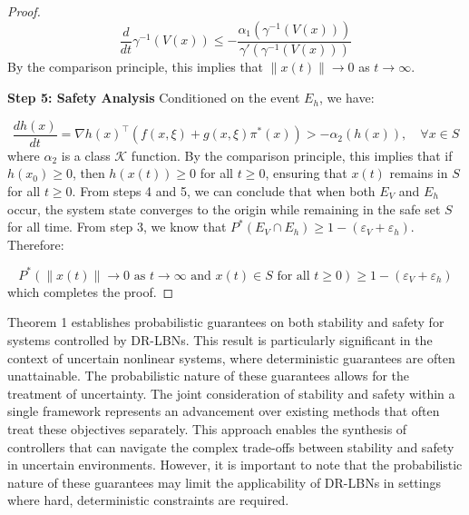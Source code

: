 \documentclass[11pt, oneside]{article}
\begin{document}
\begin{proof}
\begin{equation}
    \frac{d}{dt}\gamma^{-1}(V(x)) \leq -\frac{\alpha_1(\gamma^{-1}(V(x)))}{\gamma'(\gamma^{-1}(V(x)))}
\end{equation}
%
By the comparison principle, this implies that $\|x(t)\| \to 0$ as $t \to \infty$.

\textbf{Step 5: Safety Analysis}
%
Conditioned on the event $E_h$, we have:

\begin{equation}
    \frac{dh(x)}{dt} = \nabla h(x)^\top(f(x,\xi) + g(x,\xi)\pi^*(x)) > -\alpha_2(h(x)), \quad \forall x \in S
    \label{eq:barrier_increase}
\end{equation}
%
where $\alpha_2$ is a class $\mathcal{K}$ function. By the comparison principle, this implies that if $h(x_0) \geq 0$, then $h(x(t)) \geq 0$ for all $t \geq 0$, ensuring that $x(t)$ remains in $S$ for all $t \geq 0$. From steps 4 and 5, we can conclude that when both $E_V$ and $E_h$ occur, the system state converges to the origin while remaining in the safe set $S$ for all time. From step 3, we know that $P^*(E_V \cap E_h) \geq 1 - (\varepsilon_V + \varepsilon_h)$. Therefore:

\begin{equation}
    P^*(\|x(t)\| \to 0 \text{ as } t \to \infty \text{ and } x(t) \in S \text{ for all } t \geq 0) \geq 1 - (\varepsilon_V + \varepsilon_h)
\end{equation}
%
which completes the proof.
\end{proof}

 Theorem 1 establishes probabilistic guarantees on both stability and safety for systems controlled by DR-LBNs. This result is particularly significant in the context of uncertain nonlinear systems, where deterministic guarantees are often unattainable. The probabilistic nature of these guarantees allows for the treatment of uncertainty. The joint consideration of stability and safety within a single framework represents an advancement over existing methods that often treat these objectives separately. This approach enables the synthesis of controllers that can navigate the complex trade-offs between stability and safety in uncertain environments. However, it is important to note that the probabilistic nature of these guarantees may limit the applicability of DR-LBNs in settings where hard, deterministic constraints are required.
\end{document}
